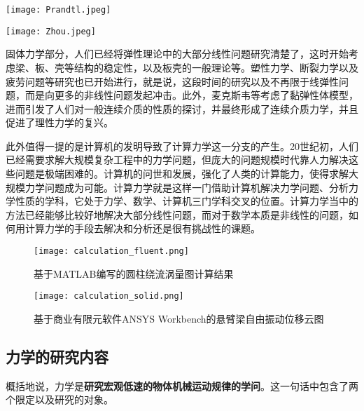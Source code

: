 \begin{marginparfigure}
    \texttt{[image: Prandtl.jpeg]}
\end{marginparfigure}


\begin{marginparfigure}
    \texttt{[image: Zhou.jpeg]}
\end{marginparfigure}



\begin{figwindow}
    固体力学部分，人们已经将弹性理论中的大部分线性问题研究清楚了，这时开始考虑梁、板、壳等结构的稳定性，以及板壳的一般理论等。塑性力学、断裂力学以及疲劳问题等研究也已开始进行，就是说，这段时间的研究以及不再限于线弹性问题，而是向更多的非线性问题发起冲击。此外，麦克斯韦等考虑了黏弹性体模型，进而引发了人们对一般连续介质的性质的探讨，并最终形成了连续介质力学，并且促进了理性力学的复兴。
\end{figwindow}



此外值得一提的是计算机的发明导致了计算力学这一分支的产生。20世纪初，人们已经需要求解大规模复杂工程中的力学问题，但庞大的问题规模时代靠人力解决这些问题是极端困难的。计算机的问世和发展，强化了人类的计算能力，使得求解大规模力学问题成为可能。计算力学就是这样一门借助计算机解决力学问题、分析力学性质的学科，它处于力学、数学、计算机三门学科交叉的位置。计算力学当中的方法已经能够比较好地解决大部分线性问题，而对于数学本质是非线性的问题，如何用计算力学的手段去解决和分析还是很有挑战性的课题。

\begin{figure}
    \centering
    \texttt{[image: calculation\_fluent.png]}
    \caption{基于MATLAB编写的圆柱绕流涡量图计算结果}
\end{figure}

\begin{figure}
    \centering
    \texttt{[image: calculation\_solid.png]}
    \caption{基于商业有限元软件ANSYS Workbench的悬臂梁自由振动位移云图}
\end{figure}

\subsection{力学的研究内容}

概括地说，力学是\textbf{研究宏观低速的物体机械运动规律的学问}。这一句话中包含了两个限定以及研究的对象。

